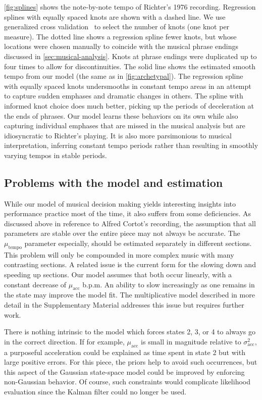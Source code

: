 \documentclass[aoas]{imsart}
\begin{document}
\autoref{fig:splines}
shows the note-by-note tempo of Richter's 1976 recording. Regression
splines with 
equally spaced knots are shown with a dashed line. We use generalized cross
validation~\citep{GolubHeath1979} to select the number of knots (one
knot per measure). The dotted line shows a regression spline fewer knots,
but whose locations were chosen
manually
to coincide with the musical phrase endings discussed in
\autoref{sec:musical-analysis}. Knots at phrase endings were
duplicated up to four times to allow for discontinuities. The solid line 
shows the estimated smooth tempo from our model (the same as in
\autoref{fig:archetypal}). The regression spline with
equally spaced knots undersmooths in constant tempo areas in an
attempt to capture sudden emphases and dramatic changes in others. The spline
with informed knot choice does much better, picking up the periods of
deceleration at the ends of phrases. Our model learns these behaviors
on its own while also capturing individual emphases that are missed in
the musical analysis but are idiosyncratic to Richter's playing. It is
also more parsimonious to musical interpretation, inferring constant
tempo periods rather than resulting in smoothly varying tempos in
stable periods.%

\subsection{Problems with the model and estimation}
\label{sec:problems-with-model}

While our model of musical decision making yields interesting insights
into performance practice most of the time, it also suffers from some
deficiencies. As discussed above in reference to Alfred Cortot's
recording, the assumption that all parameters are stable over the
entire piece may not always be accurate. The $\mu_{\textrm{tempo}}$
parameter especially, should be estimated separately in different
sections. This problem will only be compounded in more complex music
with many contrasting sections. A related issue is the current form
for the slowing down and speeding up sections. Our model assumes that
both occur linearly, with a constant decrease of $\mu_{\textrm{acc}}$
b.p.m. An ability to slow increasingly as one remains in the state may
improve the model fit. The multiplicative model described in more
detail in the Supplementary Material addresses this issue but
requires further work.

There is nothing intrinsic to the model which forces states 2,
3, or 4 to always go in the correct direction. If for example,
$\mu_{\textrm{acc}}$ is small in magnitude relative to
$\sigma^2_{\textrm{acc}}$, a purposeful acceleration could be explained as time
spent in state 2 but with large positive errors. For this piece, the
priors help to avoid such occurrences, but this aspect of the
Gaussian state-space model could be improved by enforcing non-Gaussian
behavior. Of course, such constraints would complicate likelihood
evaluation since the Kalman filter could no longer be used. 
\end{document}
